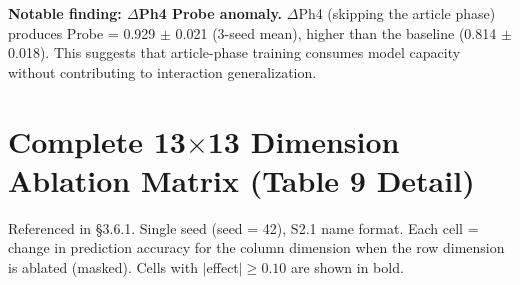\documentclass{article}
\begin{document}
\textbf{Notable finding: $\Delta$Ph4 Probe anomaly.} $\Delta$Ph4 (skipping the article phase) produces Probe = 0.929 $\pm$ 0.021 (3-seed mean), higher than the baseline (0.814 $\pm$ 0.018). This suggests that article-phase training consumes model capacity without contributing to interaction generalization.

\section[Complete 13x13 Dimension Ablation Matrix]{Complete 13$\times$13 Dimension Ablation Matrix (Table 9 Detail)}

Referenced in \S3.6.1. Single seed (seed = 42), S2.1 name format. Each cell = change in prediction accuracy for the column dimension when the row dimension is ablated (masked). Cells with $|$effect$| \geq 0.10$ are shown in bold.
\end{document}
